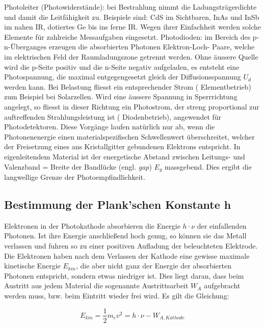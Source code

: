 Photoleiter     (Photowiderst\"ande):     bei    Bestrahlung     nimmt     die
Ladungstr\"agerdichte und damit die Leitf\"ahigkeit zu. Beispiele sind: CdS im
Sichtbaren, InAs und InSb im nahen IR, dotiertes Ge bis ins  ferne  IR.  Wegen
ihrer  Einfachheit  werden  solche  Elemente  f\"ur  zahlreiche   Messaufgaben
eingesetzt.   Photodioden:  im  Bereich  des  p-n-\"Uberganges  erzeugen   die
absorbierten Photonen Elektron-Loch- Paare, welche im  elektrischen  Feld  der
Raumladungszone  getrennt  werden. Ohne  \"aussere  Quelle  wird  die  p-Seite
positiv und  die  n-Seite  negativ aufgeladen, es entsteht eine Photospannung,
die  maximal entgegengesetzt gleich der Diffusionsspannung $U_d$ werden  kann.
Bei Belastung  fliesst ein entsprechender Strom ( Elementbetrieb) zum Beispiel
bei Solarzellen. Wird eine \"aussere Spannung  in  Sperrrichtung  angelegt, so
fliesst  in  dieser  Richtung  ein Photostrom,  der  streng  proportional  zur
auftreffenden  Strahlungsleistung   ist  (  Diodenbetrieb),  angewendet  f\"ur
Photodetektoren.  Diese   Vorg\"ange  laufen  nat\"urlich  nur  ab,  wenn  die
Photonenenergie  einen  materialspezifischen  Schwellenwert   \"uberschreitet,
welcher  der  Freisetzung  eines  ans   Kristallgitter   gebundenen  Elektrons
entspricht.  In  eigenleitendem Material ist der energetische Abstand zwischen
Leitungs-  und  Valenzband = Breite der Bandl\"ucke (engl. \textit{gap}) $E_g$
massgebend.  Dies  ergibt  die  langwellige Grenze  der  Photoempfindlichkeit.


\subsection{Bestimmung der Plank'schen Konstante h}

Elektronen  in  der  Photokathode  absorbieren  die  Energie  $h\cdot\nu$  der
einfallenden Photonen. Ist  ihre  Energie anschließend hoch genug, so k\"onnen
sie  das  Metall  verlassen  und  fuhren so zu einer positiven  Aufladung  der
beleuchteten Elektrode. Die Elektronen haben nach  dem  Verlassen  der Kathode
eine gewisse  maximale  kinetische  Energie $E_{kin}$, die aber nicht ganz der
Energie  der absorbierten Photonen entspricht, sondern  etwas  niedriger  ist.
Dies  liegt  daran,  dass  beim  Austritt  aus  jedem  Material die sogenannte
Austrittsarbeit $W_A$  aufgebracht werden muss, bzw. beim Eintritt wieder frei
wird. Es gilt die Gleichung:

\begin{equation}
    E_{kin} = \frac{1}{2}m_e v^2 = h\cdot\nu - W_{A,Kathode}
\end{equation}

